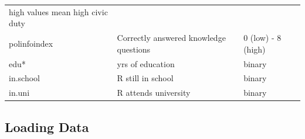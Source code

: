 \documentclass[]{article}
\theoremstyle{definition}
\theoremstyle{definition}
\theoremstyle{remark}
\begin{document}
\begin{longtable}[c]{@{}lll@{}}
\begin{minipage}[t]{0.27\columnwidth}\raggedright\strut
high values mean high civic duty
\strut\end{minipage}\tabularnewline
\begin{minipage}[t]{0.19\columnwidth}\raggedright\strut
polinfoindex
\strut\end{minipage} &
\begin{minipage}[t]{0.49\columnwidth}\raggedright\strut
Correctly answered knowledge questions
\strut\end{minipage} &
\begin{minipage}[t]{0.27\columnwidth}\raggedright\strut
0 (low) - 8 (high)
\strut\end{minipage}\tabularnewline
\begin{minipage}[t]{0.19\columnwidth}\raggedright\strut
edu*
\strut\end{minipage} &
\begin{minipage}[t]{0.49\columnwidth}\raggedright\strut
yrs of education
\strut\end{minipage} &
\begin{minipage}[t]{0.27\columnwidth}\raggedright\strut
binary
\strut\end{minipage}\tabularnewline
\begin{minipage}[t]{0.19\columnwidth}\raggedright\strut
in.school
\strut\end{minipage} &
\begin{minipage}[t]{0.49\columnwidth}\raggedright\strut
R still in school
\strut\end{minipage} &
\begin{minipage}[t]{0.27\columnwidth}\raggedright\strut
binary
\strut\end{minipage}\tabularnewline
\begin{minipage}[t]{0.19\columnwidth}\raggedright\strut
in.uni
\strut\end{minipage} &
\begin{minipage}[t]{0.49\columnwidth}\raggedright\strut
R attends university
\strut\end{minipage} &
\begin{minipage}[t]{0.27\columnwidth}\raggedright\strut
binary
\strut\end{minipage}\tabularnewline
\bottomrule
\end{longtable}

\subsection{Loading Data}\label{loading-data}
\end{document}
